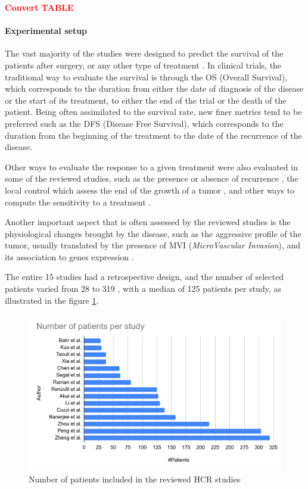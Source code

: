 \documentclass[]{article}
\let\oldparagraph\paragraph
\renewcommand{\paragraph}[1]{\oldparagraph{#1}\mbox{}}
\begin{document}
\textcolor{red}{\textbf{Convert TABLE}}





\paragraph{Experimental setup}\label{experimental-setup}

The vast majority of the studies were designed to predict the survival
of the patients after surgery, or any other type of treatment \cite{Cozzi2017,Akai2018,Chen2017,Li2016,Banerjee2015,Segal2007,Zheng2018,Xia2018}. In
clinical trials, the traditional way to evaluate the survival is through
the OS (Overall Survival), which corresponds to the duration from either
the date of diagnosis of the disease or the start of its treatment, to
either the end of the trial or the death of the patient. Being often
assimilated to the survival rate, new finer metrics tend to be preferred
such as the DFS (Disease Free Survival), which corresponds to the
duration from the beginning of the treatment to the date of the
recurrence of the disease.

Other ways to evaluate the response to a given treatment were also
evaluated in some of the reviewed studies, such as the presence or
absence of recurrence \cite{Zhou2017a,Zheng2018}, the local control
which assess the end of the growth of a tumor \cite{Cozzi2017},
and other ways to compute the sensitivity to a treatment \cite{Kuo2007,Li2016}.

Another important aspect that is often assessed by the reviewed studies
is the physiological changes brought by the disease, such as the
aggressive profile of the tumor, usually translated by the presence of
MVI (\emph{MicroVascular Invasion}), and its association to genes
expression \cite{Kuo2007,Banerjee2015,Renzulli2016,Segal2007,Peng2018,Bakr2017,Taouli2017}.

The entire 15 studies had a retrospective design, and the number of
selected patients varied from 28 \cite{Bakr2017} to 319
\cite{Zheng2018}, with a median of 125 patients per study, as illustrated in the figure \ref{HCR_studies_number_of_patients}.


\begin{figure}[th!]
	\centering
	\includegraphics[width=0.7\linewidth]{images/image2}
	\caption{Number of patients included in the reviewed HCR studies}
	\label{HCR_studies_number_of_patients}
\end{figure}
\end{document}
